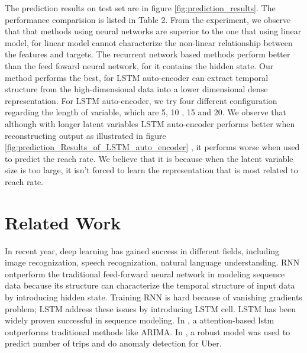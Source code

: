 \documentclass[5p]{elsarticle}
\newcommand{\dabiaolv}{reach rate}
\begin{document}
The prediction results on test set are in figure \ref{fig:prediction_results}. The performance comparision is listed in Table 2. From the experiment, we observe that that methods using neural networks are superior to the one that using linear model, for linear model cannot characterize the non-linear relationship between the features and targets. The recurrent network based methods perform better than the feed foward neural network, for it contains the hidden state. Our method performs the best, for LSTM auto-encoder can extract temporal structure from the high-dimensional data into a lower dimensional dense representation. For LSTM auto-encoder, we try four different configuration regarding the length of variable, which are 5, 10 , 15 and 20. We observe that although with longer latent variables LSTM auto-encoder performs better when reconstructing output as illustrated in figure \ref{fig:prediction_Results_of_LSTM_auto_encoder} , it performs worse when used to predict the \dabiaolv . We believe that it is because when the latent variable size is too large, it isn't forced to learn the representation that is most related to \dabiaolv.     
 
\section{Related Work}
In recent year, deep learning has gained success in different fields, including image recognization, speech recognization, natural language understanding\cite{Lecun2015}. RNN\cite{Schmidhuber1989} outperform the traditional feed-forward neural network in modeling sequence data because its structure can characterize the temporal structure of input data by introducing hidden state. Training RNN is hard because of vanishing gradients problem; LSTM address these issues by introducing LSTM cell\cite{Hochreiter1997LongMemory}. LSTM has been widely proven successful in sequence modeling. In \cite{Qin}, a attention-based lstm outperforms traditional methods like ARIMA. In \cite{Zhu2017DeepUber}, a robust model was used to predict number of trips and do anomaly detection for Uber. 
\end{document}
